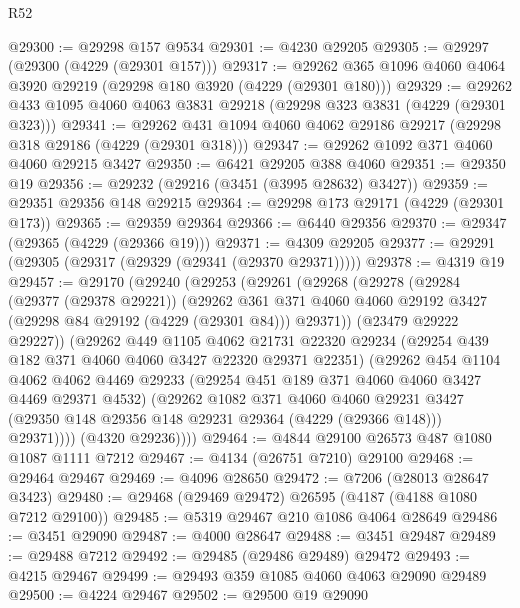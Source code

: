 \begin{lexlean}{R52}
\begin{coremodule}
@29300 := @29298 @157 @9534
@29301 := @4230 @29205
@29305 := @29297 (@29300 (@4229 (@29301 @157)))
@29317 := @29262 @365 @1096 @4060 @4064 @3920 @29219 (@29298 @180 @3920 (@4229 (@29301 @180)))
@29329 := @29262 @433 @1095 @4060 @4063 @3831 @29218 (@29298 @323 @3831 (@4229 (@29301 @323)))
@29341 := @29262 @431 @1094 @4060 @4062 @29186 @29217 (@29298 @318 @29186 (@4229 (@29301 @318)))
@29347 := @29262 @1092 @371 @4060 @4060 @29215 @3427
@29350 := @6421 @29205 @388 @4060
@29351 := @29350 @19
@29356 := @29232 (@29216 (@3451 (@3995 @28632) @3427))
@29359 := @29351 @29356 @148 @29215
@29364 := @29298 @173 @29171 (@4229 (@29301 @173))
@29365 := @29359 @29364
@29366 := @6440 @29356
@29370 := @29347 (@29365 (@4229 (@29366 @19)))
@29371 := @4309 @29205
@29377 := @29291 (@29305 (@29317 (@29329 (@29341 (@29370 @29371)))))
@29378 := @4319 @19
@29457 := @29170
    (@29240
      (@29253
        (@29261
          (@29268
            (@29278
              (@29284
                (@29377 (@29378 @29221))
                (@29262
                  @361
                  @371
                  @4060
                  @4060
                  @29192
                  @3427
                  (@29298 @84 @29192 (@4229 (@29301 @84)))
                  @29371))
              (@23479 @29222 @29227))
            (@29262
              @449
              @1105
              @4062
              @21731
              @22320
              @29234
              (@29254 @439 @182 @371 @4060 @4060 @3427 @22320 @29371 @22351)
              (@29262
                @454
                @1104
                @4062
                @4062
                @4469
                @29233
                (@29254 @451 @189 @371 @4060 @4060 @3427 @4469 @29371 @4532)
                (@29262
                  @1082
                  @371
                  @4060
                  @4060
                  @29231
                  @3427
                  (@29350 @148 @29356 @148 @29231 @29364 (@4229 (@29366 @148)))
                  @29371))))
          (@4320 @29236))))
@29464 := @4844 @29100 @26573 @487 @1080 @1087 @1111 @7212
@29467 := @4134 (@26751 @7210) @29100
@29468 := @29464 @29467
@29469 := @4096 @28650
@29472 := @7206 (@28013 @28647 @3423)
@29480 := @29468 (@29469 @29472) @26595 (@4187 (@4188 @1080 @7212 @29100))
@29485 := @5319 @29467 @210 @1086 @4064 @28649
@29486 := @3451 @29090
@29487 := @4000 @28647
@29488 := @3451 @29487
@29489 := @29488 @7212
@29492 := @29485 (@29486 @29489) @29472
@29493 := @4215 @29467
@29499 := @29493 @359 @1085 @4060 @4063 @29090 @29489
@29500 := @4224 @29467
@29502 := @29500 @19 @29090

\end{coremodule}
\end{lexlean}
